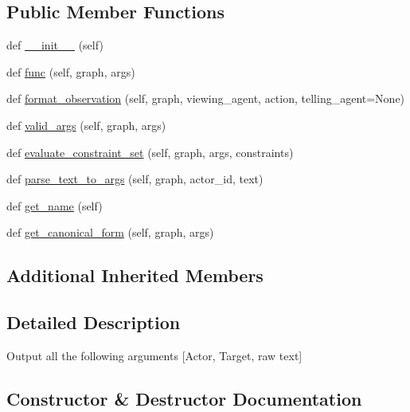 \subsection*{Public Member Functions}
\begin{DoxyCompactItemize}
\item 
def \hyperlink{classlight__chats_1_1graph_1_1TellFunction_ab0442ec224b9e0a627806d5634be2926}{\+\_\+\+\_\+init\+\_\+\+\_\+} (self)
\item 
def \hyperlink{classlight__chats_1_1graph_1_1TellFunction_a91e865e9bbba1f3ed3f01445896be21d}{func} (self, graph, args)
\item 
def \hyperlink{classlight__chats_1_1graph_1_1TellFunction_ab4c8496d4fa9e03040b6090eaa65528a}{format\+\_\+observation} (self, graph, viewing\+\_\+agent, action, telling\+\_\+agent=None)
\item 
def \hyperlink{classlight__chats_1_1graph_1_1TellFunction_a86e8534217b3d10cb4daf5cc080d624e}{valid\+\_\+args} (self, graph, args)
\item 
def \hyperlink{classlight__chats_1_1graph_1_1TellFunction_ad70758fa554b68e7b2517704a7ab5e76}{evaluate\+\_\+constraint\+\_\+set} (self, graph, args, constraints)
\item 
def \hyperlink{classlight__chats_1_1graph_1_1TellFunction_a88ac4115a6cca664cd220fb0b8852629}{parse\+\_\+text\+\_\+to\+\_\+args} (self, graph, actor\+\_\+id, text)
\item 
def \hyperlink{classlight__chats_1_1graph_1_1TellFunction_a39a099e864d0d20f997c03d96d7e1df8}{get\+\_\+name} (self)
\item 
def \hyperlink{classlight__chats_1_1graph_1_1TellFunction_a1ce8fd5a8ee86a01e68e9115f8cc9108}{get\+\_\+canonical\+\_\+form} (self, graph, args)
\end{DoxyCompactItemize}
\subsection*{Additional Inherited Members}


\subsection{Detailed Description}
\begin{DoxyVerb}Output all the following arguments [Actor, Target, raw text]
\end{DoxyVerb}
 

\subsection{Constructor \& Destructor Documentation}
\mbox{\label{classlight__chats_1_1graph_1_1TellFunction_ab0442ec224b9e0a627806d5634be2926}} 
